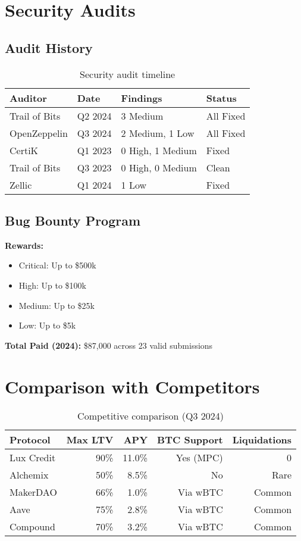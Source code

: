 \documentclass[11pt,a4paper]{article}
\begin{document}
\section{Security Audits}

\subsection{Audit History}

\begin{table}[h]
\centering
\begin{tabular}{@{}llll@{}}
\toprule
\textbf{Auditor} & \textbf{Date} & \textbf{Findings} & \textbf{Status} \\ \midrule
Trail of Bits & Q2 2024 & 3 Medium & All Fixed \\
OpenZeppelin & Q3 2024 & 2 Medium, 1 Low & All Fixed \\
CertiK & Q1 2023 & 0 High, 1 Medium & Fixed \\
Trail of Bits & Q3 2023 & 0 High, 0 Medium & Clean \\
Zellic & Q1 2024 & 1 Low & Fixed \\ \bottomrule
\end{tabular}
\caption{Security audit timeline}
\end{table}

\subsection{Bug Bounty Program}

\textbf{Rewards:}
\begin{itemize}
\item Critical: Up to \$500k
\item High: Up to \$100k
\item Medium: Up to \$25k
\item Low: Up to \$5k
\end{itemize}

\textbf{Total Paid (2024):} \$87,000 across 23 valid submissions

\section{Comparison with Competitors}

\begin{table}[h]
\centering
\small
\begin{tabular}{@{}lrrrr@{}}
\toprule
\textbf{Protocol} & \textbf{Max LTV} & \textbf{APY} & \textbf{BTC Support} & \textbf{Liquidations} \\ \midrule
Lux Credit & 90\% & 11.0\% & Yes (MPC) & 0 \\
Alchemix & 50\% & 8.5\% & No & Rare \\
MakerDAO & 66\% & 1.0\% & Via wBTC & Common \\
Aave & 75\% & 2.8\% & Via wBTC & Common \\
Compound & 70\% & 3.2\% & Via wBTC & Common \\ \bottomrule
\end{tabular}
\caption{Competitive comparison (Q3 2024)}
\end{table}
\end{document}
